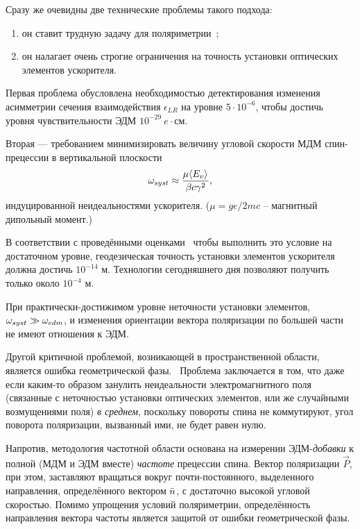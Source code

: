 Сразу же очевидны две технические проблемы такого подхода:
\begin{enumerate}
	\item он ставит трудную задачу для поляриметрии~\cite[стр.~6]{Mane:SpinWheel};
	\item он налагает очень строгие ограничения на точность установки оптических элементов ускорителя.
\end{enumerate}

Первая проблема обусловлена необходимостью детектирования изменения асимметрии сечения 
взаимодействия $\epsilon_{LR}$ на уровне $5\cdot 10^{-6}$, чтобы достичь уровня чувствительности
ЭДМ $10^{-29}~e\cdot$см.~\cite[стр.~18]{BNL:Deuteron2008}

Вторая --- требованием минимизировать величину угловой скорости МДМ спин-прецессии в 
вертикальной плоскости~\cite[стр.~11]{BNL:Deuteron2008}
\begin{equation}\label{eq:ImperfectionWheelRollRate}
	\w_{syst} \approx \frac{\mu\avg{E_v}}{\beta c\gamma^2},
\end{equation}
индуцированной неидеальностями ускорителя. ($\mu=ge/2mc$ -- магнитный дипольный момент.)

В соответствии с проведёнными оценками~\cite{Senichev:FDM} чтобы выполнить это условие на достаточном уровне,
геодезическая точность установки элементов ускорителя должна достичь $10^{-14}$ м. 
Технологии сегодняшнего дня позволяют получить только около $10^{-4}$ м.

При практически-достижимом уровне неточности установки элементов, $\omega_{syst}\gg\omega_{edm}$,
и изменения ориентации вектора поляризации по большей части не имеют отношения к ЭДМ.

Другой критичной проблемой, возникающей в пространственной области, является ошибка
геометрической фазы.~\cite[стр.~6]{BNL:Proton}  Проблема заключается в том, что даже если
каким-то образом занулить неидеальности электромагнитного поля (связанные с неточностью
установки оптических элементов, или же случайными возмущениями поля) \emph{в среднем},
поскольку повороты спина не коммутируют, угол поворота поляризации, вызванный ими, не 
будет равен нулю.

Напротив, методология частотной области основана на измерении ЭДМ-\emph{добавки} к полной
(МДМ и ЭДМ вместе) \emph{частоте} прецессии спина. Вектор поляризации $\vec P$, при этом, 
заставляют вращаться вокруг почти-постоянного, выделенного направления,
определённого вектором $\bar n$, с достаточно высокой угловой скоростью. Помимо упрощения 
условий поляриметрии, определённость направления вектора частоты является защитой от ошибки 
геометрической фазы.

